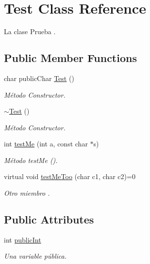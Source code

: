 \hypertarget{class_test}{\section{\-Test \-Class \-Reference}
\label{class_test}
}


\-La clase \-Prueba .  


\subsection*{\-Public \-Member \-Functions}
\begin{DoxyCompactItemize}
\item 
char public\-Char \hyperlink{class_test_a8bff0433752199b84d406a346f469aa7}{\-Test} ()
\begin{DoxyCompactList}\small\item\em \-Método \-Constructor. \end{DoxyCompactList}\item 
\hyperlink{class_test_a2b0a62f1e667bbe8d8cb18d785bfa991}{$\sim$\-Test} ()
\begin{DoxyCompactList}\small\item\em \-Método \-Constructor. \end{DoxyCompactList}\item 
int \hyperlink{class_test_af7115d71dda64654a7104c24f130e8d0}{test\-Me} (int a, const char $\ast$s)
\begin{DoxyCompactList}\small\item\em \-Método test\-Me (). \end{DoxyCompactList}\item 
virtual void \hyperlink{class_test_a3edb9fdc1e9f0d5274b57386ab03704c}{test\-Me\-Too} (char c1, char c2)=0
\begin{DoxyCompactList}\small\item\em \-Otro miembro . \end{DoxyCompactList}\end{DoxyCompactItemize}
\subsection*{\-Public \-Attributes}
\begin{DoxyCompactItemize}
\item 
int \hyperlink{class_test_a0482046a625919d34f156707e94f6ac4}{public\-Int}
\begin{DoxyCompactList}\small\item\em \-Una variable pública. \end{DoxyCompactList}\end{DoxyCompactItemize}


